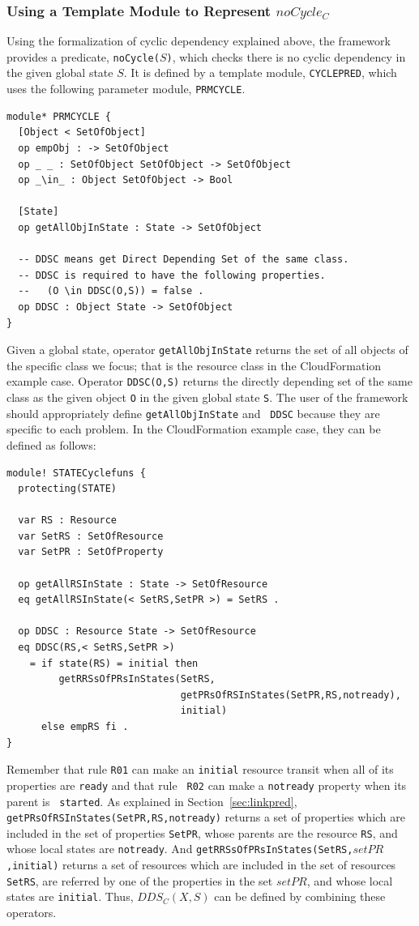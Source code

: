 \documentclass[12pt]{report}
\newcommand{\stt}[1]{{\small{\tt {#1}}}}
\begin{document}
\subsubsection{Using a Template Module to Represent $noCycle_C$}
Using the formalization of cyclic dependency explained above, the
framework provides a predicate, \stt{noCycle($S$)}, which checks there
is no cyclic dependency in the given global state $S$. It is defined
by a template module, {\tt CYCLEPRED}, which uses the following
parameter module, {\tt PRMCYCLE}.
\begin{verbatim}
module* PRMCYCLE {
  [Object < SetOfObject]
  op empObj : -> SetOfObject
  op _ _ : SetOfObject SetOfObject -> SetOfObject
  op _\in_ : Object SetOfObject -> Bool

  [State]
  op getAllObjInState : State -> SetOfObject

  -- DDSC means get Direct Depending Set of the same class.
  -- DDSC is required to have the following properties.
  --   (O \in DDSC(O,S)) = false .
  op DDSC : Object State -> SetOfObject
}
\end{verbatim}
Given a global state, operator {\tt getAllObjInState} returns the set
of all objects of the specific class we focus; that is the resource
class in the CloudFormation example case. Operator \stt{DDSC(O,S)}
returns the directly depending set of the same class as the given
object {\tt O} in the given global state {\tt S}. The user of the
framework should appropriately define {\tt getAllObjInState} and {\tt
  DDSC} because they are specific to each problem. In the
CloudFormation example case, they can be defined as follows:
\begin{verbatim}
module! STATECyclefuns {
  protecting(STATE)

  var RS : Resource
  var SetRS : SetOfResource
  var SetPR : SetOfProperty

  op getAllRSInState : State -> SetOfResource
  eq getAllRSInState(< SetRS,SetPR >) = SetRS .

  op DDSC : Resource State -> SetOfResource
  eq DDSC(RS,< SetRS,SetPR >)
    = if state(RS) = initial then
         getRRSsOfPRsInStates(SetRS,
                              getPRsOfRSInStates(SetPR,RS,notready),
                              initial)
      else empRS fi .
}
\end{verbatim}
Remember that rule {\tt R01} can make an {\tt initial} resource
transit when all of its properties are {\tt ready} and that rule {\tt
  R02} can make a {\tt notready} property when its parent is {\tt
  started}. As explained in Section~\ref{sec:linkpred},
\stt{getPRsOfRSInStates(SetPR,RS,notready)} returns a set of
properties which are included in the set of properties {\tt SetPR},
whose parents are the resource {\tt RS}, and whose local states are
{\tt notready}. And \stt{getRRSsOfPRsInStates(SetRS,$setPR$,initial)}
returns a set of resources which are included in the set of resources
{\tt SetRS}, are referred by one of the properties in the set $setPR$,
and whose local states are {\tt initial}. Thus, $DDS_C(X,S)$ can be
defined by combining these operators.
\end{document}

